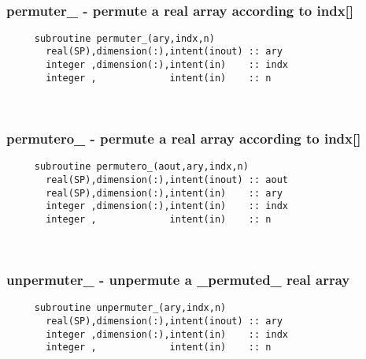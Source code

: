  
\mbox{}\hrulefill\ 
 

  \subsubsection{permuter\_ - permute a real array according to indx[]}

\begin{verbatim} 
     subroutine permuter_(ary,indx,n)
       real(SP),dimension(:),intent(inout) :: ary
       integer ,dimension(:),intent(in)    :: indx
       integer ,             intent(in)    :: n
 \end{verbatim}%
 
 
\mbox{}\hrulefill\ 
 
  \subsubsection{permutero\_ - permute a real array according to indx[]}

\begin{verbatim} 
     subroutine permutero_(aout,ary,indx,n)
       real(SP),dimension(:),intent(inout) :: aout
       real(SP),dimension(:),intent(in)    :: ary
       integer ,dimension(:),intent(in)    :: indx
       integer ,             intent(in)    :: n
 \end{verbatim}%
 
 
\mbox{}\hrulefill\ 

  \subsubsection{unpermuter\_ - unpermute a \_permuted\_ real array}

\begin{verbatim} 
     subroutine unpermuter_(ary,indx,n)
       real(SP),dimension(:),intent(inout) :: ary
       integer ,dimension(:),intent(in)    :: indx
       integer ,             intent(in)    :: n
 \end{verbatim}%
 
